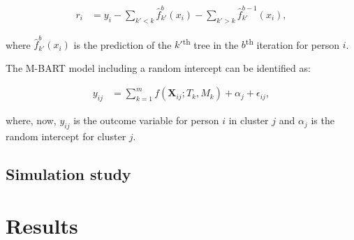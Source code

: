 \documentclass[10pt, a4paper, titlepage]{article}
\begin{document}
\begin{subequations}
\label{eq:partialresiduals}
\begin{align}
r_i &= y_i - \sum_{k' < k} \hat{f}^{b}_{k'}(x_{i}) - \sum_{k' > k} \hat{f}^{b-1}_{k'}(x_{i}), \tag{2}
\end{align}
\end{subequations}

where $\hat{f}^{b}_{k'}(x_{i})$ is the prediction of the $k'$\textsuperscript{th} tree in the $b$\textsuperscript{th} iteration for person $i$.

The M-BART model including a random intercept can be identified as:

\begin{subequations}
\label{eq:M-BART}
\begin{align}
y_{ij} &= \sum_{k=1}^{m} f(\textbf{X}_{ij}; T_{k}, M_{k}) + \alpha_{j} + \epsilon_{ij}, \tag{3}
\end{align}
\end{subequations}

where, now, $y_{ij}$ is the outcome variable for person $i$ in cluster $j$ and $\alpha_{j}$ is the random intercept for cluster $j$.

\subsection{Simulation study}

\section{Results}

\newpage


\end{document}

